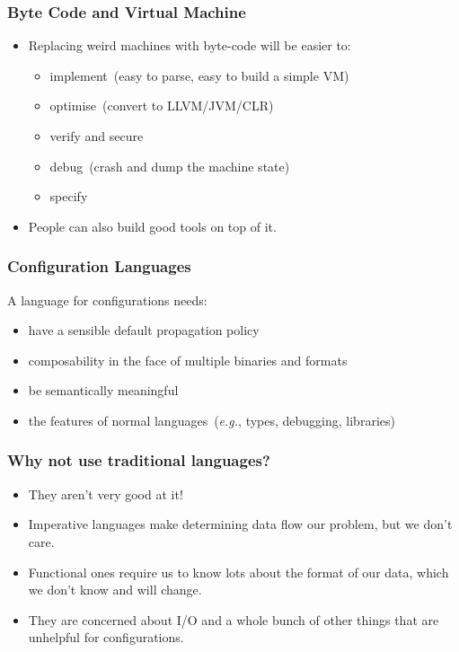 \documentclass{beamer}
\begin{document}
\begin{frame}\frametitle{Byte Code and Virtual Machine}
\begin{itemize}
\item Replacing weird machines with byte-code will be easier to:
\begin{itemize}
\item implement~(easy to parse, easy to build a simple VM)
\item optimise~(convert to LLVM/JVM/CLR)
\item verify and secure
\item debug~(crash and dump the machine state)
\item specify
\end{itemize}
\item People can also build good tools on top of it.
\end{itemize}
\end{frame}


\begin{frame}\frametitle{Configuration Languages}
A language for configurations needs:
\begin{itemize}
\item have a sensible default propagation policy
\item composability in the face of multiple binaries and formats
\item be semantically meaningful
\item the features of normal languages~(\emph{e.g.}, types, debugging, libraries)
\end{itemize}
\end{frame}

\begin{frame}\frametitle{Why not use traditional languages?}
\begin{itemize}
\item They aren't very good at it!
\item Imperative languages make determining data flow our problem, but we don't care.
\item Functional ones require us to know lots about the format of our data, which we don't know and will change.
\item They are concerned about I/O and a whole bunch of other things that are unhelpful for configurations.
\end{itemize}
\end{frame}
\end{document}
